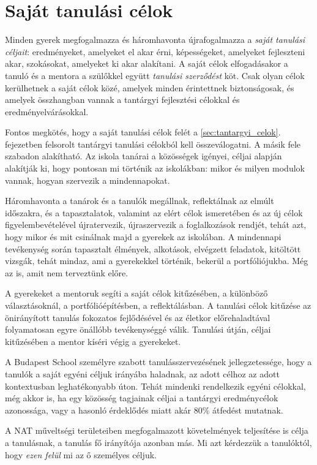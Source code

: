 \section{Saját tanulási célok}

Minden gyerek megfogalmazza és háromhavonta újrafogalmazza a \emph{saját
  tanulási céljait}: eredményeket, amelyeket el akar érni, képességeket,
amelyeket fejleszteni akar, szokásokat, amelyeket ki akar alakítani. A saját
célok elfogadásakor a tanuló és a mentora a szülőkkel együtt \emph{tanulási
  szerződést} köt. Csak olyan célok kerülhetnek a saját célok közé, amelyek
minden érintettnek biztonságosak, és amelyek összhangban vannak a tantárgyi
fejlesztési célokkal és eredményelvárásokkal.

Fontos megkötés, hogy a saját tanulási célok felét a \ref{sec:tantargyi_celok}.
fejezetben felsorolt tantárgyi tanulási célokból kell összeválogatni. A másik
fele szabadon alakítható. Az iskola tanárai a közösségek igényei, céljai
alapján alakítják ki, hogy pontosan mi történik az iskolákban: mikor és milyen
modulok vannak, hogyan szervezik a mindennapokat.

Háromhavonta a tanárok és a tanulók megállnak, reflektálnak az elmúlt
időszakra, és a tapasztalatok, valamint az elért célok ismeretében és az új
célok figyelembevételével újratervezik, újraszervezik a foglalkozások rendjét,
tehát azt, hogy mikor és mit csinálnak majd a gyerekek az iskolában.
A mindennapi tevékenység során tapasztalt élmények, alkotások, elvégzett
feladatok, kitöltött vizsgák, tehát mindaz, ami a gyerekekkel történik, bekerül
a portfóliójukba. Még az is, amit nem terveztünk előre.

A gyerekeket a mentoruk segíti a saját célok kitűzésében, a különböző
választásoknál, a portfólióépítésben, a reflektálásban. A tanulási célok
kitűzése az önirányított tanulás fokozatos fejlődésével és az életkor
előrehaladtával folyamatosan egyre önállóbb tevékenységgé válik. Tanulási
útján, céljai kitűzésében a mentor kíséri végig a gyerekeket.

A Budapest School személyre szabott tanulásszervezésének jellegzetessége, hogy
a tanulók a saját egyéni céljuk irányába haladnak, az adott célhoz az adott
kontextusban leghatékonyabb úton. Tehát mindenki rendelkezik egyéni célokkal,
még akkor is, ha egy közösség tagjainak céljai a tantárgyi eredménycélok
azonossága, vagy a hasonló érdeklődés miatt akár  80\% átfedést mutatnak.

A NAT műveltségi területeiben megfogalmazott követelmények teljesítése is célja
a tanulásnak, a tanulás fő irányítója azonban más. Mi azt kérdezzük a
tanulóktól, hogy \emph{ezen felül} mi az ő személyes céljuk.

